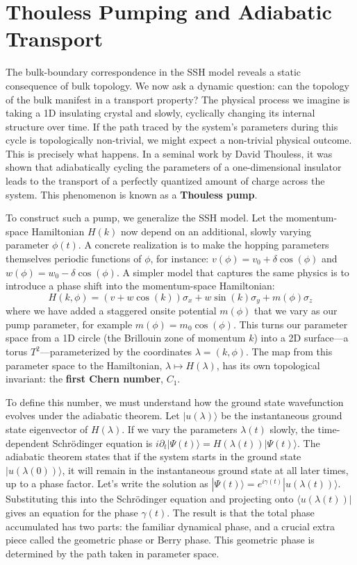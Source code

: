 \section{Thouless Pumping and Adiabatic Transport}
\label{sec:thouless_pumping}

The bulk-boundary correspondence in the SSH model reveals a static consequence of bulk topology.
We now ask a dynamic question: can the topology of the bulk manifest in a transport property?
The physical process we imagine is taking a 1D insulating crystal and slowly, cyclically changing its internal structure over time.
If the path traced by the system's parameters during this cycle is topologically non-trivial, we might expect a non-trivial physical outcome.
This is precisely what happens.
In a seminal work by David Thouless, it was shown that adiabatically cycling the parameters of a one-dimensional insulator leads to the transport of a perfectly quantized amount of charge across the system.
This phenomenon is known as a \textbf{Thouless pump}.

To construct such a pump, we generalize the SSH model.
Let the momentum-space Hamiltonian $H(k)$ now depend on an additional, slowly varying parameter $\phi(t)$.
A concrete realization is to make the hopping parameters themselves periodic functions of $\phi$, for instance: $v(\phi) = v_0 + \delta\cos(\phi)$ and $w(\phi) = w_0 - \delta\cos(\phi)$.
A simpler model that captures the same physics is to introduce a phase shift into the momentum-space Hamiltonian:
\begin{equation}
    H(k, \phi) = (v + w \cos(k))\sigma_x + w \sin(k)\sigma_y + m(\phi)\sigma_z
\end{equation}
where we have added a staggered onsite potential $m(\phi)$ that we vary as our pump parameter, for example $m(\phi) = m_0 \cos(\phi)$.
This turns our parameter space from a 1D circle (the Brillouin zone of momentum $k$) into a 2D surface—a torus $T^2$—parameterized by the coordinates $\lambda = (k, \phi)$.
The map from this parameter space to the Hamiltonian, $\lambda \mapsto H(\lambda)$, has its own topological invariant: the \textbf{first Chern number}, $C_1$.

To define this number, we must understand how the ground state wavefunction evolves under the adiabatic theorem.
Let $|u(\lambda)\rangle$ be the instantaneous ground state eigenvector of $H(\lambda)$.
If we vary the parameters $\lambda(t)$ slowly, the time-dependent Schrödinger equation is $i\partial_t |\Psi(t)\rangle = H(\lambda(t)) |\Psi(t)\rangle$.
The adiabatic theorem states that if the system starts in the ground state $|u(\lambda(0))\rangle$, it will remain in the instantaneous ground state at all later times, up to a phase factor.
Let's write the solution as $|\Psi(t)\rangle = e^{i\gamma(t)} |u(\lambda(t))\rangle$.
Substituting this into the Schrödinger equation and projecting onto $\langle u(\lambda(t))|$ gives an equation for the phase $\gamma(t)$.
The result is that the total phase accumulated has two parts: the familiar dynamical phase, and a crucial extra piece called the geometric phase or Berry phase.
This geometric phase is determined by the path taken in parameter space.

